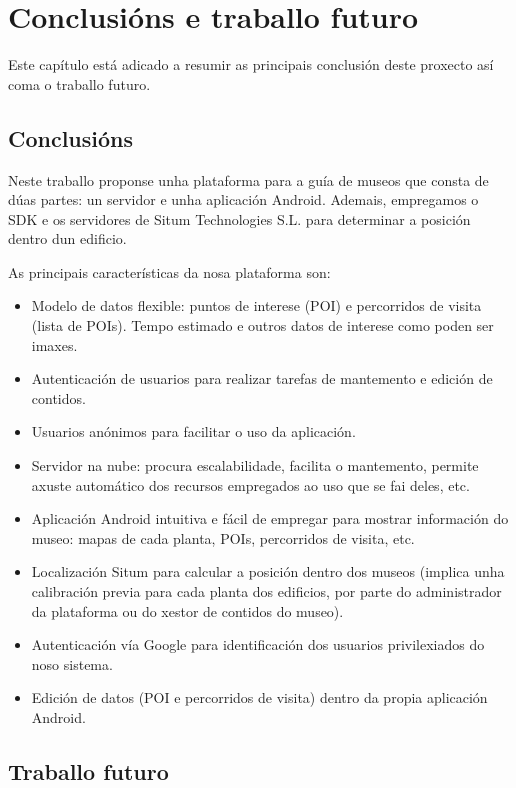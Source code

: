 \chapter{Conclusións e traballo futuro}
Este capítulo está adicado a resumir as principais conclusión deste proxecto así coma o traballo futuro.


\section{Conclusións}

Neste traballo proponse unha plataforma para a guía de museos que consta de dúas partes: un servidor e unha aplicación Android.
Ademais, empregamos o SDK e os servidores de Situm Technologies S.L. para determinar a posición dentro dun edificio.

As principais características da nosa plataforma son:
\begin{itemize}
	\item Modelo de datos flexible: puntos de interese (POI) e percorridos de visita (lista de POIs). Tempo estimado e outros datos de interese como poden ser imaxes.
	\item Autenticación de usuarios para realizar tarefas de mantemento e edición de contidos.
	\item Usuarios anónimos para facilitar o uso da aplicación.
	\item Servidor na nube: procura escalabilidade, facilita o mantemento, permite axuste automático dos recursos empregados ao uso que se fai deles, etc.
	\item Aplicación Android intuitiva e fácil de empregar para mostrar información do museo: mapas de cada planta, POIs, percorridos de visita, etc.
	\item Localización Situm para calcular a posición dentro dos museos (implica unha calibración previa para cada planta dos edificios, por parte do administrador da plataforma ou do xestor de contidos do museo).
	\item Autenticación vía Google para identificación dos usuarios privilexiados do noso sistema.
	\item Edición de datos (POI e percorridos de visita) dentro da propia aplicación Android.
\end{itemize}


\section{Traballo futuro}

